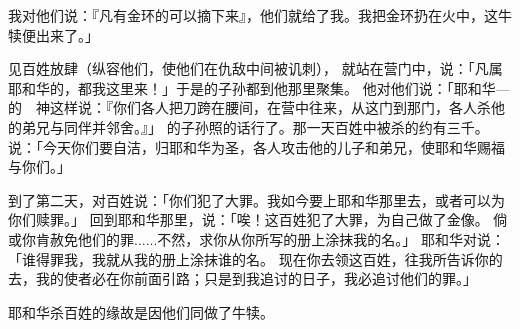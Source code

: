{我对他们说：『凡有金环的可以摘下来』，他们就给了我。我把金环扔在火中，这牛犊便出来了。」
\par }{\PP {}见百姓放肆（{}纵容他们，使他们在仇敌中间被讥刺），
就站在营门中，说：「凡属耶和华的，都{}我这里来！」于是{}的子孙都到他那里聚集。
他对他们说：「耶和华—{}的　神这样说：『你们各人把刀跨在腰间，在营中往来，从这门到那门，各人杀他的弟兄与同伴并邻舍。』」
的子孙照{}的话行了。那一天百姓中被杀的约有三千。
说：「今天你们要自洁，归耶和华为圣，各人攻击他的儿子和弟兄，使耶和华赐福与你们。」
\par }{\PP {}到了第二天，{}对百姓说：「你们犯了大罪。我如今要上耶和华那里去，或者可以为你们赎罪。」
回到耶和华那里，说：「唉！这百姓犯了大罪，为自己做了金像。
倘或你肯赦免他们的罪......不然，求你从你所写的册上涂抹我的名。」
耶和华对{}说：「谁得罪我，我就从我的册上涂抹谁的名。
现在你去领这百姓，往我所告诉你的{}去，我的使者必在你前面引路；只是到我追讨的日子，我必追讨他们的罪。」
\par }{\PP {}耶和华杀百姓的缘故是因他们同{}做了牛犊。

}
